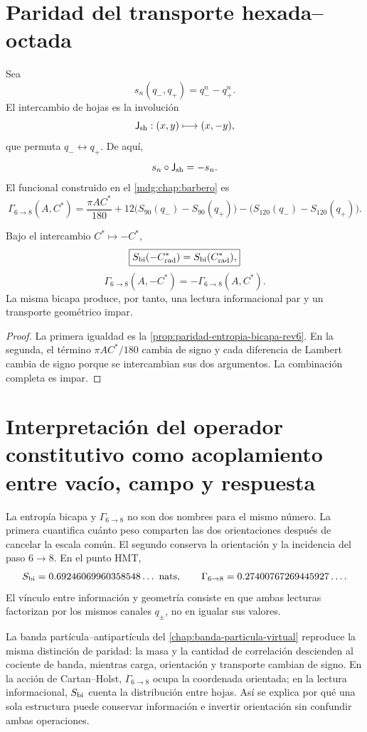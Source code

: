 \section{Paridad del transporte hexada--octada}

Sea
\[
 s_n(q_-,q_+)=q_-^n-q_+^n.
\]
El intercambio de hojas es la involución
\[
 \mathsf J_{\rm sh}:(x,y)\longmapsto(x,-y),
\]
que permuta \(q_-\leftrightarrow q_+\). De aquí,
\[
 s_n\circ\mathsf J_{\rm sh}=-s_n.
\]
El funcional construido en el \cref{mdg:chap:barbero} es
\[
 \Gamma_{6\to8}(A,C^*)
 =
 \frac{\pi A C^*}{180}
{}+12\bigl(S_{90}(q_-)-S_{90}(q_+)\bigr)
-\bigl(S_{120}(q_-)-S_{120}(q_+)\bigr).
\]

\begin{theorem}
\label{thm:paridad-bicapa-barbero-rev6}
Bajo el intercambio \(C^*\mapsto-C^*\),
\[
 \boxed{S_{\rm bi}(-C^*_{\rm rad})
        =S_{\rm bi}(C^*_{\rm rad}),}
\]
\[
 \boxed{\Gamma_{6\to8}(A,-C^*)
        =-\Gamma_{6\to8}(A,C^*).}
\]
La misma bicapa produce, por tanto, una lectura informacional par y un
transporte geométrico impar.
\end{theorem}

\begin{proof}
La primera igualdad es la
\cref{prop:paridad-entropia-bicapa-rev6}. En la segunda, el término
\(\pi AC^*/180\) cambia de signo y cada diferencia de Lambert cambia de
signo porque se intercambian sus dos argumentos. La combinación completa es
impar.
\end{proof}

\section{Interpretación del operador constitutivo como acoplamiento entre vacío, campo y respuesta}

La entropía bicapa y \(\Gamma_{6\to8}\) no son dos nombres para el mismo
número. La primera cuantifica cuánto peso comparten las dos orientaciones
después de cancelar la escala común. El segundo conserva la orientación y la
incidencia del paso \(6\to8\). En el punto HMT,
\[
 S_{\rm bi}
 =0.69246069960358548\ldots\ {\rm nats},
 \qquad
 \Gamma_{6\to8}
 =0.27400767269445927\ldots.
\]
El vínculo entre información y geometría consiste en que ambas lecturas
factorizan por los mismos canales \(q_\pm\), no en igualar sus valores.

La banda partícula--antipartícula del
\cref{chap:banda-particula-virtual} reproduce la misma distinción de
paridad: la masa y la cantidad de correlación descienden al cociente de
banda, mientras carga, orientación y transporte cambian de signo. En la
acción de Cartan--Holst, \(\Gamma_{6\to8}\) ocupa la coordenada orientada;
en la lectura informacional, \(S_{\rm bi}\) cuenta la distribución entre
hojas. Así se explica por qué una sola estructura puede conservar
información e invertir orientación sin confundir ambas operaciones.
